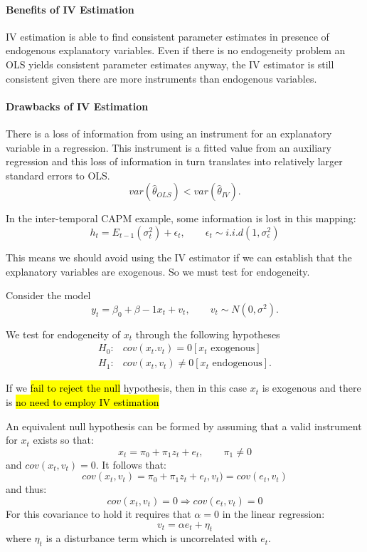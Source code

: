 \documentclass[11pt]{article}
\begin{document}
\paragraph{Benefits of IV Estimation} \mbox{}

IV estimation is able to find consistent parameter estimates in presence of endogenous explanatory variables. Even if there is no endogeneity problem an OLS yields consistent parameter estimates anyway, the IV estimator is still consistent given there are more instruments than endogenous variables.

\paragraph{Drawbacks of IV Estimation} \mbox{}

There is a loss of information from using an instrument for an explanatory variable in a regression. This instrument is a fitted value from an auxiliary regression and this loss of information in turn translates into relatively larger standard errors to OLS.
\[var(\hat{\theta}_{OLS}) < var(\hat{\theta}_{IV}).\]

In the inter-temporal CAPM example, some information is lost in this mapping:
\[h_t = E_{t-1}(\sigma_t^2) + \epsilon_t, \qquad \epsilon_t \sim i.i.d(1,\sigma_\epsilon^2)\]

This means we should avoid using the IV estimator if we can establish that the explanatory variables are exogenous. So we must test for endogeneity.


    Consider the model
    \[y_t = \beta_0 + \beta-1 x_t + v_t, \qquad v_t \sim N(0,\sigma^2).\]

    We test for endogeneity of $x_t$ through the following hypotheses
    \begin{align*}
        H_0:& cov(x_t.v_t) = 0 [x_t\text{ exogenous}] \\
        H_1:& cov(x_t,v_t) \neq 0 [x_t \text{ endogenous}].
    \end{align*}

    If we \hl{fail to reject the null} hypothesis, then in this case $x_t$ is exogenous and there is \hl{no need to employ IV estimation}

    An equivalent null hypothesis can be formed by assuming that a valid instrument for $x_t$ exists so that:
    \[x_t = \pi_0 + \pi_1 z_t + e_t, \qquad \pi_1 \neq0\]
    and $cov(x_t,v_t)=0$. It follows that:
    \[cov(x_t,v_t) = \pi_0 + \pi_1 z_t + e_t,v_t) = cov(e_t,v_t)\]
    and thus:
    \[cov(x_t,v_t) = 0 \Rightarrow cov(e_t,v_t) = 0\]
    For this covariance to hold it requires that $\alpha=0$ in the linear regression:
    \[v_t = \alpha e_t + \eta_t\]
    where $\eta_t$ is a disturbance term which is uncorrelated with $e_t$.
\end{document}
